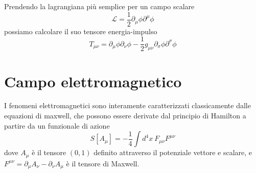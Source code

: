     Prendendo la lagrangiana più semplice per un campo scalare 
\begin{equation}
    \mathcal L = \frac{1}{2} \partial_\mu \phi \partial^\mu \phi
\end{equation}
    possiamo calcolare il suo tensore energia-impulso
\begin{equation}
    T_{\mu\nu} = \partial_\mu \phi \partial_\nu \phi - \frac{1}{2} g_{\mu\nu} \partial_\sigma \phi \partial^\sigma \phi
\end{equation}

\section{Campo elettromagnetico}
    I fenomeni elettromagnetici sono interamente caratterizzati classicamente dalle equazioni di maxwell, che possono essere derivate dal principio di Hamilton a partire da un funzionale di azione 
\begin{equation} \label{azionemaxwell}
    S[A_\mu] = - \frac{1}{4} \int d^4 x ~ F_{\mu\nu} F^{\mu\nu}
\end{equation}
    dove $A_\mu$ è il tensore $(0, 1)$ definito attraverso il potenziale vettore e scalare, e $F^{\mu\nu} = \partial_\mu A_\nu - \partial_\nu A_\mu$ è il tensore di Maxwell. 

